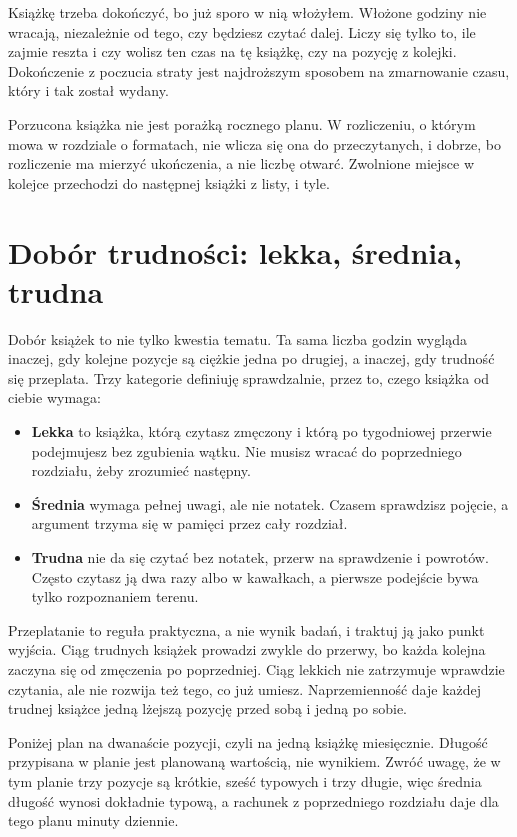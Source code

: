 \begin{falle}
  Książkę trzeba dokończyć, bo już sporo w nią włożyłem. Włożone godziny nie wracają, niezależnie od tego, czy będziesz czytać dalej. Liczy się tylko to, ile zajmie reszta i czy wolisz ten czas na tę książkę, czy na pozycję z kolejki. Dokończenie z poczucia straty jest najdroższym sposobem na zmarnowanie czasu, który i tak został wydany.
\end{falle}

Porzucona książka nie jest porażką rocznego planu. W rozliczeniu, o którym mowa w rozdziale o formatach, nie wlicza się ona do przeczytanych, i dobrze, bo rozliczenie ma mierzyć ukończenia, a nie liczbę otwarć. Zwolnione miejsce w kolejce przechodzi do następnej książki z listy, i tyle.

\section{Dobór trudności: lekka, średnia, trudna}

Dobór książek to nie tylko kwestia tematu. Ta sama liczba godzin wygląda inaczej, gdy kolejne pozycje są ciężkie jedna po drugiej, a inaczej, gdy trudność się przeplata. Trzy kategorie definiuję sprawdzalnie, przez to, czego książka od ciebie wymaga:

\begin{itemize}
  \item \textbf{Lekka} to książka, którą czytasz zmęczony i którą po tygodniowej przerwie podejmujesz bez zgubienia wątku. Nie musisz wracać do poprzedniego rozdziału, żeby zrozumieć następny.
  \item \textbf{Średnia} wymaga pełnej uwagi, ale nie notatek. Czasem sprawdzisz pojęcie, a argument trzyma się w pamięci przez cały rozdział.
  \item \textbf{Trudna} nie da się czytać bez notatek, przerw na sprawdzenie i powrotów. Często czytasz ją dwa razy albo w kawałkach, a pierwsze podejście bywa tylko rozpoznaniem terenu.
\end{itemize}

Przeplatanie to reguła praktyczna, a nie wynik badań, i traktuj ją jako punkt wyjścia. Ciąg trudnych książek prowadzi zwykle do przerwy, bo każda kolejna zaczyna się od zmęczenia po poprzedniej. Ciąg lekkich nie zatrzymuje wprawdzie czytania, ale nie rozwija też tego, co już umiesz. Naprzemienność daje każdej trudnej książce jedną lżejszą pozycję przed sobą i jedną po sobie.

Poniżej plan na dwanaście pozycji, czyli na jedną książkę miesięcznie. Długość przypisana w planie jest planowaną wartością, nie wynikiem. Zwróć uwagę, że w tym planie trzy pozycje są krótkie, sześć typowych i trzy długie, więc średnia długość wynosi dokładnie typową, a rachunek z poprzedniego rozdziału daje dla tego planu  minuty dziennie.

